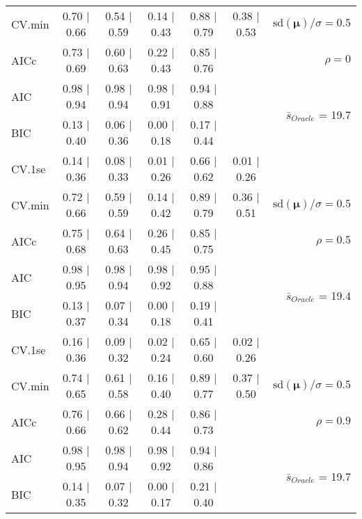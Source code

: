 \begin{table}
\begin{center}
\begin{tabular}{l*{5}{c}|r}
CV.min & 0.70 $\mid$ 0.66 & 0.54 $\mid$ 0.59 & 0.14 $\mid$ 0.43 & 0.88 $\mid$ 0.79 & 0.38 $\mid$ 0.53 &  $\mathrm{sd}(\mathbf{\mu})/\sigma=0.5$ \\
AICc & 0.73 $\mid$ 0.69 & 0.60 $\mid$ 0.63 & 0.22 $\mid$ 0.43 & 0.85 $\mid$ 0.76 & & $\rho=0$ \\
AIC & 0.98 $\mid$ 0.94 & 0.98 $\mid$ 0.94 & 0.98 $\mid$ 0.91 & 0.94 $\mid$ 0.88 & &  \multirow{2}{*}{$\bar{s}_{Oracle}$ = 19.7} \\
BIC & 0.13 $\mid$ 0.40 & 0.06 $\mid$ 0.36 & 0.00 $\mid$ 0.18 & 0.17 $\mid$ 0.44 & &  \\
 \hline 
CV.1se & 0.14 $\mid$ 0.36 & 0.08 $\mid$ 0.33 & 0.01 $\mid$ 0.26 & 0.66 $\mid$ 0.62 & 0.01 $\mid$ 0.26 & \\
CV.min & 0.72 $\mid$ 0.66 & 0.59 $\mid$ 0.59 & 0.14 $\mid$ 0.42 & 0.89 $\mid$ 0.79 & 0.36 $\mid$ 0.51 &  $\mathrm{sd}(\mathbf{\mu})/\sigma=0.5$ \\
AICc & 0.75 $\mid$ 0.68 & 0.64 $\mid$ 0.63 & 0.26 $\mid$ 0.45 & 0.85 $\mid$ 0.75 & & $\rho=0.5$ \\
AIC & 0.98 $\mid$ 0.95 & 0.98 $\mid$ 0.94 & 0.98 $\mid$ 0.92 & 0.95 $\mid$ 0.88 & &  \multirow{2}{*}{$\bar{s}_{Oracle}$ = 19.4} \\
BIC & 0.13 $\mid$ 0.37 & 0.07 $\mid$ 0.34 & 0.00 $\mid$ 0.18 & 0.19 $\mid$ 0.41 & &  \\
 \hline 
CV.1se & 0.16 $\mid$ 0.36 & 0.09 $\mid$ 0.32 & 0.02 $\mid$ 0.24 & 0.65 $\mid$ 0.60 & 0.02 $\mid$ 0.26 & \\
CV.min & 0.74 $\mid$ 0.65 & 0.61 $\mid$ 0.58 & 0.16 $\mid$ 0.40 & 0.89 $\mid$ 0.77 & 0.37 $\mid$ 0.50 &  $\mathrm{sd}(\mathbf{\mu})/\sigma=0.5$ \\
AICc & 0.76 $\mid$ 0.66 & 0.66 $\mid$ 0.62 & 0.28 $\mid$ 0.44 & 0.86 $\mid$ 0.73 & & $\rho=0.9$ \\
AIC & 0.98 $\mid$ 0.95 & 0.98 $\mid$ 0.94 & 0.98 $\mid$ 0.92 & 0.94 $\mid$ 0.86 & &  \multirow{2}{*}{$\bar{s}_{Oracle}$ = 19.7} \\
BIC & 0.14 $\mid$ 0.35 & 0.07 $\mid$ 0.32 & 0.00 $\mid$ 0.17 & 0.21 $\mid$ 0.40 & &  \\
 \hline 
\end{tabular}
\end{center}
\vspace{-1cm}
\end{table}




